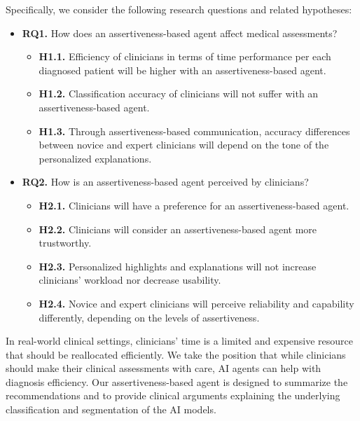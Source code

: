 \noindent
Specifically, we consider the following research questions and related hypotheses:

\vspace{0.5mm}

\begin{itemize}
\item {\bf RQ1.} How does an assertiveness-based agent affect medical assessments?
\begin{itemize}
\item {\bf H1.1.} Efficiency of clinicians in terms of time performance per each diagnosed patient will be higher with an assertiveness-based agent.
\item {\bf H1.2.} Classification accuracy of clinicians will not suffer with an assertiveness-based agent.
\item {\bf H1.3.} Through assertiveness-based communication, accuracy differences between novice and expert clinicians will depend on the tone of the personalized explanations.
\end{itemize}
\item {\bf RQ2.} How is an assertiveness-based agent perceived by clinicians?
\begin{itemize}
\item {\bf H2.1.} Clinicians will have a preference for an assertiveness-based agent.
\item {\bf H2.2.} Clinicians will consider an assertiveness-based agent more trustworthy.
\item {\bf H2.3.} Personalized highlights and explanations will not increase clinicians' workload nor decrease usability.
\item {\bf H2.4.} Novice and expert clinicians will perceive reliability and capability differently, depending on the levels of assertiveness.
\end{itemize}
\end{itemize}

In real-world clinical settings, clinicians' time is a limited and expensive resource that should be reallocated efficiently.
We take the position that while clinicians should make their clinical assessments with care, \ac{AI} agents can help with diagnosis efficiency.
Our assertiveness-based agent is designed to summarize the recommendations and to provide clinical arguments explaining the underlying classification and segmentation of the \ac{AI} models.

